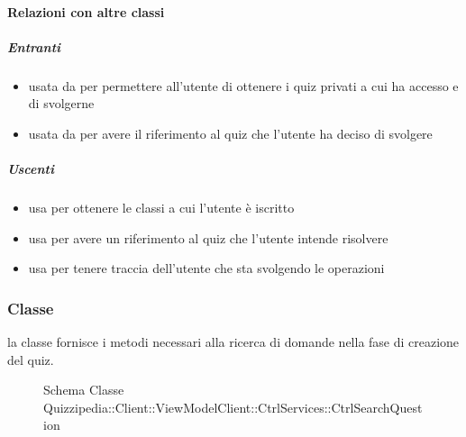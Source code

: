 \paragraph{Relazioni con altre classi}
\subparagraph{Entranti}
\begin{itemize}
\item usata da  per permettere all'utente di ottenere i quiz privati a cui ha accesso e di svolgerne
\item usata da  per avere il riferimento al quiz che l'utente ha deciso di svolgere
\end{itemize}
\subparagraph{Uscenti}
\begin{itemize}
\item usa  per ottenere le classi a cui l'utente è iscritto
\item usa  per avere un riferimento al quiz che l'utente intende risolvere
\item usa  per tenere traccia dell'utente che sta svolgendo le operazioni
\end{itemize}
\subsubsection{Classe }
la classe fornisce i metodi necessari alla ricerca di domande nella fase di creazione del quiz.
\begin{figure}[H]
\centering
\noindent{}
\caption[Schema Classe CtrlSearchQuestion]{Schema Classe Quizzipedia::Client::ViewModelClient::CtrlServices::CtrlSearchQuestion}
\end{figure}
